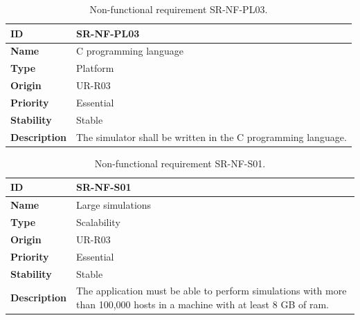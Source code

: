 \begin{center}
\begin{table}[htbp]
\centering
\begin{tabular}{@{}p{2.5cm} p{9cm}@{}} 
\toprule
\textbf{ID} 				& SR-NF-PL03\\
\midrule
\textbf{Name} 			& C programming language \\
\midrule
\textbf{Type} 			& Platform\\
\midrule
\textbf{Origin} 			& UR-R03 \\
\midrule
\textbf{Priority}		& Essential \\
\midrule
\textbf{Stability} 		& Stable \\
\midrule
\textbf{Description} 	& The simulator shall be written in the C programming language. \\
\bottomrule
\end{tabular}
\caption{Non-functional requirement SR-NF-PL03.}
\label{tab:srnfpl03}
\end{table}
\end{center}

\begin{center}
\begin{table}[htbp]
\centering
\begin{tabular}{@{}p{2.5cm} p{9cm}@{}} 
\toprule
\textbf{ID} 				& SR-NF-S01\\
\midrule
\textbf{Name} 			& Large simulations \\
\midrule
\textbf{Type} 			& Scalability \\
\midrule
\textbf{Origin} 			& UR-R03 \\
\midrule
\textbf{Priority}		& Essential \\
\midrule
\textbf{Stability} 		& Stable \\
\midrule
\textbf{Description} 	& The application must be able to perform simulations with more than 100,000 hosts in a machine with at least 8 GB of \gls{ram}. \\
\bottomrule
\end{tabular}
\caption{Non-functional requirement SR-NF-S01.}
\label{tab:srnfs01}
\end{table}
\end{center}

